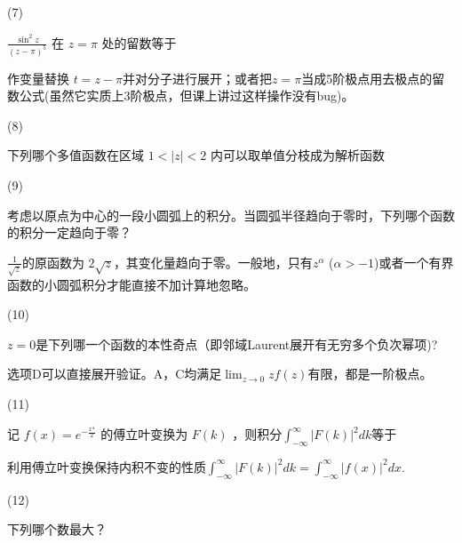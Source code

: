 \documentclass[12pt,CJK]{article}
\begin{document}
{{    }
  
\item[(7)]{$\frac{\sin^2 z}{\left(z-\pi\right)^5}$ 在 $z=\pi$ 处的留数等于 



  {\small \red 作变量替换 $t=z-\pi$并对分子进行展开；或者把$z=\pi$当成5阶极点用去极点的留数公式(虽然它实质上3阶极点，但课上讲过这样操作没有bug)。}
}


\item[(8)]{下列哪个多值函数在区域 $1<|z|<2$ 内可以取单值分枝成为解析函数 

    }

\item[(9)]{ 考虑以原点为中心的一段小圆弧上的积分。当圆弧半径趋向于零时，下列哪个函数的积分一定趋向于零？  


{\small \red $\frac{1}{\sqrt{z}}$的原函数为 $2\sqrt{z}$，其变化量趋向于零。一般地，只有$z^\alpha$ ($\alpha>-1$)或者一个有界函数的小圆弧积分才能直接不加计算地忽略。}
}

\item[(10)]{$z=0$是下列哪一个函数的本性奇点（即邻域Laurent展开有无穷多个负次幂项)? 


    {\red\small 选项D可以直接展开验证。A，C均满足$\lim_{z\rightarrow 0} z f(z)$有限，都是一阶极点。}
  }
  
\item[(11)]{ 记 $f(x)=e^{-\frac{x^4}{2}}$ 的傅立叶变换为 $F(k)$ ，则积分$\int_{-\infty}^{\infty} |F(k)|^2 dk$等于 


{\small \red 利用傅立叶变换保持内积不变的性质$\int_{-\infty}^{\infty} |F(k)|^2 dk = \int_{-\infty}^\infty |f(x)|^2dx$.}
}
  
\item[(12)]{ 下列哪个数最大？ 


}}
\end{document}
